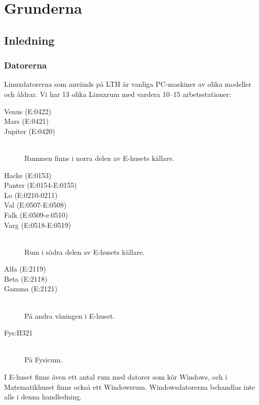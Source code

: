 \documentclass[a4paper,twocolumn]{book}
\begin{document}
\mainmatter

\chapter{Grunderna}
\label{cha:grunderna}



\section{Inledning}


\subsection{Datorerna}

Linuxdatorerna som används på LTH är vanliga PC-maskiner av olika
modeller och åldrar. Vi har 13 olika Linuxrum med
vardera 10--15 arbetsstationer:
\begin{description}
\item[Venus (E:0422)] 
\item[Mars (E:0421)]
\item[Jupiter (E:0420)] \mbox{}\\
  Rummen finns i norra delen av E-husets källare. 
\item[Hacke (E:0153)]
\item[Panter (E:0154-E:0155)] 
\item[Lo (E:0210-0211)]
\item[Val (E:0507-E:0508)]
\item[Falk (E:0509-e:0510)]
\item[Varg (E:0518-E:0519)] \mbox{}\\
  Rum i södra delen av E-husets källare.
\item[Alfa (E:2119)] 
\item[Beta (E:2118)] 
\item[Gamma (E:2121)] \mbox{}\\
  På andra våningen i E-huset.
\item[Fys:H321] \mbox{}\\
  På Fysicum.
\end{description}

I E-huset finns även ett antal rum med datorer som kör Windows, och i
Matematikhuset finns också ett Windowsrum.
Windowsdatorerna behandlas inte alls i denna handledning.
\end{document}
